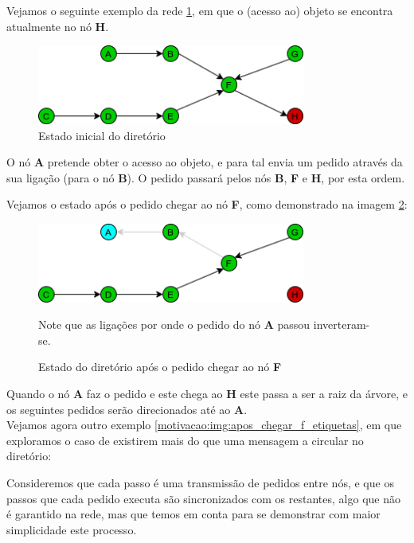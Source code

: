 Vejamos o seguinte exemplo da rede \ref{motivacao:img:estado_inicial}, em que o (acesso ao) objeto se encontra atualmente no nó \textbf{H}.


\begin{figure}[!htb]
\centering
\includegraphics[width=250pt]{um_pedido_1.png}
\caption{Estado inicial do diretório}
\label{motivacao:img:estado_inicial}
\end{figure}

O nó \textbf{A} pretende obter o acesso ao objeto, e para tal envia um pedido através da sua ligação (para o nó \textbf{B}).
O pedido passará pelos nós \textbf{B}, \textbf{F} e \textbf{H}, por esta ordem.

Vejamos o estado após o pedido chegar ao nó \textbf{F}, como demonstrado na imagem \ref{motivacao:img:apos_chegar_f}:

\begin{figure}[!htb]
\centering
\includegraphics[width=250pt]{um_pedido_2.png}
\caption{Estado do diretório após o pedido chegar ao nó \textbf{F}}
Note que as ligações por onde o pedido do nó \textbf{A} passou inverteram-se.
\label{motivacao:img:apos_chegar_f}
\end{figure}


Quando o nó \textbf{A} faz o pedido e este chega ao \textbf{H} este passa a ser a raiz da árvore, e os seguintes pedidos serão direcionados até ao \textbf{A}.\\



Vejamos agora outro exemplo \ref{motivacao:img:apos_chegar_f_etiquetas}, em que exploramos o caso de existirem mais do que uma mensagem a circular no diretório:

Consideremos que cada passo é uma transmissão de pedidos entre nós, e que os passos que cada pedido executa são sincronizados com os restantes, algo que não é garantido na rede, mas que temos em conta para se demonstrar com maior simplicidade este processo.

